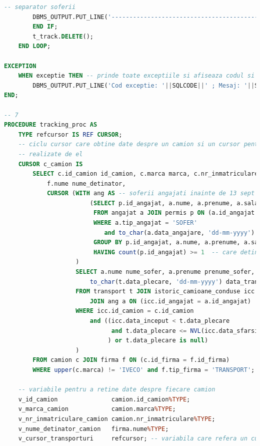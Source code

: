 \documentclass[12pt, a4paper]{article}
\begin{document}
\begin{lstlisting}[language=SQL]
        -- separator soferii
        DBMS_OUTPUT.PUT_LINE('-----------------------------------------------');     
        END IF;
        t_track.DELETE();
    END LOOP;

EXCEPTION
    WHEN exceptie THEN -- prinde toate exceptiile si afiseaza codul si mesajul
        DBMS_OUTPUT.PUT_LINE('Cod exceptie: '||SQLCODE||' ; Mesaj: '||SQLERRM);
END;

-- 7
PROCEDURE tracking_proc AS
    TYPE refcursor IS REF CURSOR;
    -- ciclu cursor care obtine date despre un camion si un cursor pentru transporturile
    -- realizate de el
    CURSOR c_camion IS
        SELECT c.id_camion id_camion, c.marca marca, c.nr_inmatriculare nr_inmatriculare,
            f.nume nume_detinator,
            CURSOR (WITH ang AS -- soferii angajati inainte de 13 sept 2020 care detin cel mult 2 permise auto
                        (SELECT p.id_angajat, a.nume, a.prenume, a.salariu
                         FROM angajat a JOIN permis p ON (a.id_angajat = p.id_angajat)
                         WHERE a.tip_angajat = 'SOFER'
                            and to_char(a.data_angajare, 'dd-mm-yyyy') < '13-9-2020' 
                         GROUP BY p.id_angajat, a.nume, a.prenume, a.salariu
                         HAVING count(p.id_angajat) >= 1  -- care detine cel putin 1 permis  
                    )
                    SELECT a.nume nume_sofer, a.prenume prenume_sofer, a.salariu salariu_sofer,
                        to_char(t.data_plecare, 'dd-mm-yyyy') data_transport
                    FROM transport t JOIN istoric_camioane_conduse icc ON (t.id_camion = icc.id_camion)
                        JOIN ang a ON (icc.id_angajat = a.id_angajat)
                    WHERE icc.id_camion = c.id_camion
                        and ((icc.data_inceput < t.data_plecare 
                              and t.data_plecare <= NVL(icc.data_sfarsit, sysdate)
                             ) or t.data_plecare is null)
                    )
        FROM camion c JOIN firma f ON (c.id_firma = f.id_firma)
        WHERE upper(c.marca) != 'IVECO' and f.tip_firma = 'TRANSPORT';
        
    -- variabile pentru a retine date despre fiecare camion
    v_id_camion               camion.id_camion%TYPE;
    v_marca_camion            camion.marca%TYPE;
    v_nr_inmatriculare_camion camion.nr_inmatriculare%TYPE;
    v_nume_detinator_camion   firma.nume%TYPE;
    v_cursor_transporturi     refcursor; -- variabila care refera un cursor
    

\end{lstlisting}
\end{document}
